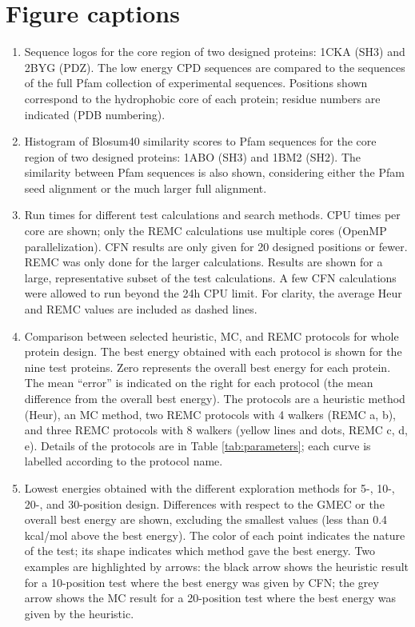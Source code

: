 \documentclass[a4paper,12pt]{article}
\begin{document}
\section*{Figure captions}
\begin{enumerate}
\item \label{fig:logos}
Sequence logos for the core region of two designed proteins: 1CKA (SH3) and 2BYG (PDZ).
The low energy CPD sequences are compared to the sequences of the full Pfam collection of
experimental sequences. Positions shown correspond to the hydrophobic core of each
protein; residue numbers are indicated (PDB numbering).

\item \label{fig:similarity}
Histogram of Blosum40 similarity scores to Pfam sequences for the core region of two
designed proteins: 1ABO (SH3) and 1BM2 (SH2). The similarity between Pfam sequences is
also shown, considering either the Pfam seed alignment or the much larger full alignment.

\item \label{fig:cpu}
Run times for different test calculations and search methods. CPU times per core are
shown; only the REMC calculations use multiple cores (OpenMP parallelization). CFN results
are only given for 20 designed positions or fewer. REMC was only done for the larger
calculations. Results are shown for a large, representative subset of the test calculations.
A few CFN calculations were allowed to run beyond the 24h CPU limit. For clarity, the
average Heur and REMC values are included as dashed lines.

\item \label{fig:protocols}
Comparison between selected heuristic, MC, and REMC protocols for whole protein design.
The best energy obtained with each protocol is shown for the nine test proteins. Zero represents
the overall best energy for each protein. The mean ``error'' is indicated on the right for each protocol
(the mean difference from the overall best energy). The protocols are a heuristic method (Heur), an MC
method, two REMC protocols with 4 walkers (REMC a, b), and three REMC protocols with 8 walkers (yellow
lines and dots, REMC c, d, e). Details of the protocols are in Table \ref{tab:parameters}; each curve
is labelled according to the protocol name.

\item \label{fig:errors}
Lowest energies obtained with the different exploration methods for 5-, 10-, 20-, and 30-position design. Differences
with respect to the GMEC or the overall best energy are shown, excluding the smallest values (less than 0.4 kcal/mol
above the best energy). The color of each point indicates the nature of the test; its shape indicates which method
gave the best energy. Two examples are highlighted by arrows: the black arrow shows the heuristic result for a
10-position test where the best energy was given by CFN; the grey arrow shows the MC result for a 20-position test
where the best energy was given by the heuristic.


\end{enumerate}
\end{document}
